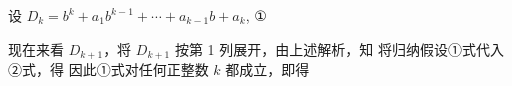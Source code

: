 
\begin{fnote}
设 $D_k=b^{k}+a_1b^{k-1}+\cdots+a_{k-1}b+a_k$, ①

现在来看 $D_{k+1}$，将 $D_{k+1}$ 按第 1 列展开，由上述解析，知
将归纳假设①式代入②式，得
因此①式对任何正整数 $k$ 都成立，即得
\end{fnote}

